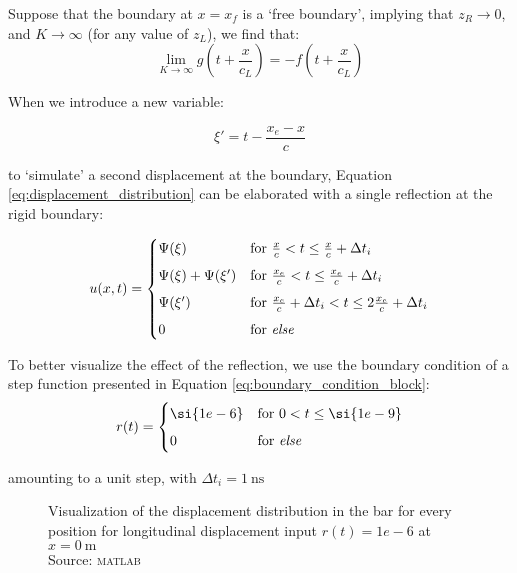 Suppose that the boundary at $x=x_f$ is a `free boundary', implying that $z_R\rightarrow 0$, and $K\rightarrow \infty$ (for any value of $z_L$), we find that:
\begin{equation}
    \lim_{K \to \infty} g\left(t + \frac{x}{c_L}\right) = -f\left(t + \frac{x}{c_L}\right)
\end{equation}

When we introduce a new variable:

\begin{equation}
    \xi' = t - \frac{x_e - x}{c}
\end{equation}

to `simulate' a second displacement at the boundary, Equation \ref{eq:displacement_distribution} can be elaborated with a single reflection at the rigid boundary:

\begin{equation}
    u(x,t)=
\begin{cases}
    \Psi(\xi) & \text{for $\frac{x}{c} < t \leq \frac{x}{c} + \Delta t_i$}
    \\[0.5em]
    \Psi(\xi) + \Psi(\xi') & \text{for $ \frac{x_e}{c} < t \leq \frac{x_e}{c} + \Delta t_i$}
    \\[0.5em]
    \Psi(\xi') & \text{for $\frac{x_e}{c} + \Delta t_i < t \leq 2\frac{x_e}{c} + \Delta t_i$}
    \\[0.5em]
    0 & \text{for \textit{else}}
\end{cases}
\end{equation}

To better visualize the effect of the reflection, we use the boundary condition of a step function presented in Equation \ref{eq:boundary_condition_block}:
\begin{equation}
r(t)=
\begin{cases}
    \si{1e-6} & \text{for $0 < t \leq \si{1e-9}$}
    \\[0.5em]
    0 & \text{for \textit{else}}
\end{cases}
\end{equation}

amounting to a unit step, with $\Delta t_i = \SI{1}{\nano\second}$

\begin{figure}[ht]
    \centering
    
    \caption{Visualization of the displacement distribution in the bar for every position for longitudinal displacement input $r(t)=\si{1e-6}$ at $x=\SI{0}{\metre}$\\Source: \textsc{matlab}}
\end{figure}